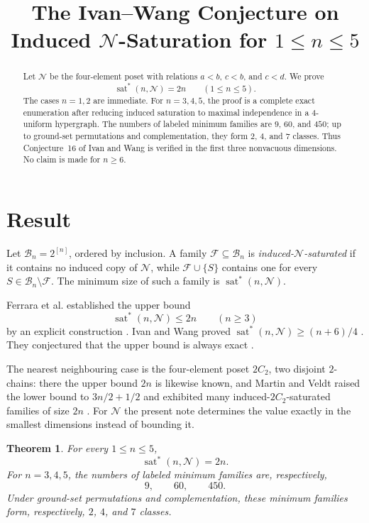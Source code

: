 \documentclass[11pt]{amsart}
\title[Induced $\mathcal N$-saturation for $n\le5$]{The Ivan--Wang Conjecture on Induced
\texorpdfstring{$\mathcal N$}{N}-Saturation for
\texorpdfstring{$1\leq n\leq 5$}{1 <= n <= 5}}
\date{}
\newtheorem{theorem}{Theorem}
\newcommand{\Bn}{\mathcal B_n}
\newcommand{\Nposet}{\mathcal N}
\newcommand{\satstar}{\operatorname{sat}^{*}}
\begin{document}
\begin{abstract}
Let $\Nposet$ be the four-element poset with relations
$a<b$, $c<b$, and $c<d$. We prove
\[
\satstar(n,\Nposet)=2n \qquad (1\leq n\leq 5).
\]
The cases $n=1,2$ are immediate. For $n=3,4,5$, the proof is a
complete exact enumeration after reducing induced saturation to maximal
independence in a $4$-uniform hypergraph. The numbers of labeled minimum
families are $9$, $60$, and $450$; up to ground-set permutations and
complementation, they form $2$, $4$, and $7$ classes. Thus Conjecture~16 of
Ivan and Wang is verified in the first three nonvacuous dimensions. No claim
is made for $n\geq 6$.
\end{abstract}

\maketitle

\section{Result}

Let $\Bn=2^{[n]}$, ordered by inclusion. A family
$\mathcal F\subseteq\Bn$ is \emph{induced-$\Nposet$-saturated} if it contains
no induced copy of $\Nposet$, while $\mathcal F\cup\{S\}$ contains one for
every $S\in\Bn\setminus\mathcal F$. The minimum size of such a family is
$\satstar(n,\Nposet)$.

Ferrara et al. established the upper bound
\[
\satstar(n,\Nposet)\leq 2n \qquad (n\geq 3)
\]
by an explicit construction \cite[Proposition~2]{FerraraEtAl}. Ivan and Wang
proved $\satstar(n,\Nposet)\geq(n+6)/4$ \cite[Theorem~12]{IvanWang}. They
conjectured that the upper bound is always exact
\cite[Conjecture~16]{IvanWang}.

The nearest neighbouring case is the four-element poset $2C_2$, two disjoint
$2$-chains: there the upper bound $2n$ is likewise known, and Martin and Veldt
raised the lower bound to $3n/2+1/2$ and exhibited many induced-$2C_2$-saturated
families of size $2n$ \cite{MartinVeldt}. For $\Nposet$ the present note
determines the value exactly in the smallest dimensions instead of bounding it.

\begin{theorem}\label{thm:main}
For every $1\leq n\leq 5$,
\[
\satstar(n,\Nposet)=2n.
\]
For $n=3,4,5$, the numbers of labeled minimum families are, respectively,
\[
9,\qquad 60,\qquad 450.
\]
Under ground-set permutations and complementation, these minimum families
form, respectively, $2$, $4$, and $7$ classes.
\end{theorem}
\end{document}
